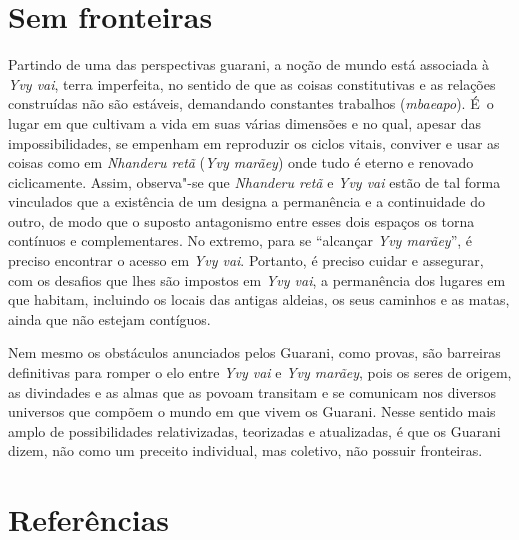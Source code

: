 \section{Sem fronteiras}

Partindo de uma das perspectivas guarani, a noção de mundo está
associada à \emph{Yvy vai}, terra imperfeita, no sentido de que as coisas
constitutivas e as relações construídas não são estáveis, demandando
constantes trabalhos (\emph{mbaeapo}). É~o lugar em que cultivam a vida em
suas várias dimensões e no qual, apesar das impossibilidades, se
empenham em reproduzir os ciclos vitais, conviver e usar as coisas como
em \emph{Nhanderu retã} (\emph{Yvy marãey}) onde tudo é eterno e renovado
ciclicamente. Assim, observa"-se que \emph{Nhanderu retã} e \emph{Yvy vai} estão de
tal forma vinculados que a existência de um designa a permanência e a
continuidade do outro, de modo que o suposto antagonismo entre esses
dois espaços os torna contínuos e complementares. No extremo, para se
``alcançar \emph{Yvy marãey}'', é preciso encontrar o acesso em \emph{Yvy vai}.
Portanto, é preciso cuidar e assegurar, com os desafios que lhes são
impostos em \emph{Yvy vai}, a permanência dos lugares em que habitam,
incluindo os locais das antigas aldeias, os seus caminhos e as matas,
ainda que não estejam contíguos. 

Nem mesmo os obstáculos anunciados pelos Guarani, como provas, são
barreiras definitivas para romper o elo entre \emph{Yvy vai} e \emph{Yvy marãey},
pois os seres de origem, as divindades e as almas que as povoam
transitam e se comunicam nos diversos universos que compõem o mundo em
que vivem os Guarani. Nesse sentido mais amplo de possibilidades
relativizadas, teorizadas e atualizadas, é que os Guarani dizem, não
como um preceito individual, mas coletivo, não possuir fronteiras.

\section{Referências}

